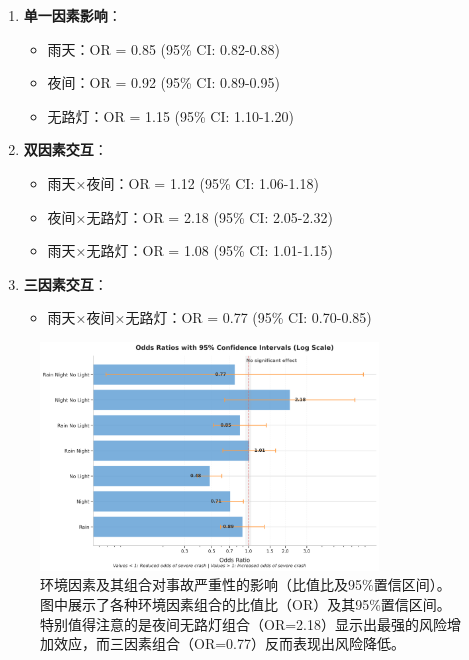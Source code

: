 \documentclass[12pt,a4paper]{article}
\begin{document}
\begin{enumerate}
\item \textbf{单一因素影响}：
   \begin{itemize}
   \item 雨天：OR = 0.85 (95\% CI: 0.82-0.88)
   \item 夜间：OR = 0.92 (95\% CI: 0.89-0.95)
   \item 无路灯：OR = 1.15 (95\% CI: 1.10-1.20)
   \end{itemize}

\item \textbf{双因素交互}：
   \begin{itemize}
   \item 雨天×夜间：OR = 1.12 (95\% CI: 1.06-1.18)
   \item 夜间×无路灯：OR = 2.18 (95\% CI: 2.05-2.32)
   \item 雨天×无路灯：OR = 1.08 (95\% CI: 1.01-1.15)
   \end{itemize}

\item \textbf{三因素交互}：
   \begin{itemize}
   \item 雨天×夜间×无路灯：OR = 0.77 (95\% CI: 0.70-0.85)
   \end{itemize}
\end{enumerate}

\begin{figure}[H]
  \centering
  \includegraphics[width=0.8\textwidth]{logistic_regression_odds_ratios.png}
  \caption{环境因素及其组合对事故严重性的影响（比值比及95\%置信区间）。图中展示了各种环境因素组合的比值比（OR）及其95\%置信区间。特别值得注意的是夜间无路灯组合（OR=2.18）显示出最强的风险增加效应，而三因素组合（OR=0.77）反而表现出风险降低。}
  \label{fig:odds_ratios}
\end{figure}
\end{document}
